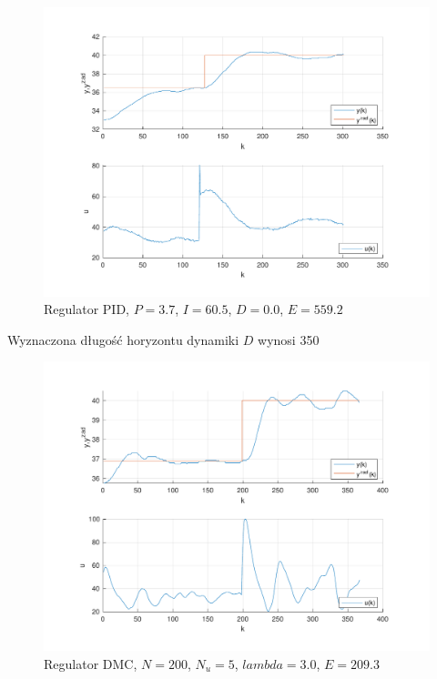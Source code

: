 \begin{figure}[H]
    \centering
    \includegraphics[scale=0.75]{../lab/zad_4/zad4pidd2.pdf}
    \caption{Regulator PID, $P=\num{3.7}$, $I=\num{60.5}$, $D=\num{0.0}$, $E=\num{559.2}$}
\end{figure}

Wyznaczona długość horyzontu dynamiki $D$ wynosi \num{350}

\begin{figure}[H]
    \centering
    \includegraphics[scale=0.75]{../lab/zad_4/zad4dmc1.pdf}
    \caption{Regulator DMC, $N=\num{200}$, $N_{u}=\num{5}$, $lambda=\num{3.0}$, $E=\num{209.3}$}
\end{figure}


